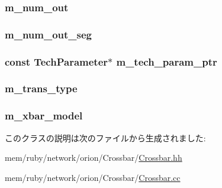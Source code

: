 \label{classCrossbar_a208d6aff22a25e908b139b8d84950212}
\hypertarget{classCrossbar_ae171d0f87af81b1ea185cf41b5877bdc}{
\subsubsection[{m\_\-num\_\-out}]{ {\bf m\_\-num\_\-out}}}
\label{classCrossbar_ae171d0f87af81b1ea185cf41b5877bdc}
\hypertarget{classCrossbar_ad3f4c106c1f38c6c0fa1030e00e2b925}{
\subsubsection[{m\_\-num\_\-out\_\-seg}]{ {\bf m\_\-num\_\-out\_\-seg}}}
\label{classCrossbar_ad3f4c106c1f38c6c0fa1030e00e2b925}
\hypertarget{classCrossbar_a11d1644aa2bfe0e16783dface6fadf13}{
\subsubsection[{m\_\-tech\_\-param\_\-ptr}]{\setlength{\rightskip}{0pt plus 5cm}const {\bf TechParameter}$\ast$ {\bf m\_\-tech\_\-param\_\-ptr}}}
\label{classCrossbar_a11d1644aa2bfe0e16783dface6fadf13}
\hypertarget{classCrossbar_ac53175ac9654b65ce59b57695eaa749c}{
\subsubsection[{m\_\-trans\_\-type}]{ {\bf m\_\-trans\_\-type}}}
\label{classCrossbar_ac53175ac9654b65ce59b57695eaa749c}
\hypertarget{classCrossbar_ae408c5e80d21ee95cc1ea98cdf4491bf}{
\subsubsection[{m\_\-xbar\_\-model}]{ {\bf m\_\-xbar\_\-model}}}
\label{classCrossbar_ae408c5e80d21ee95cc1ea98cdf4491bf}


このクラスの説明は次のファイルから生成されました:\begin{DoxyCompactItemize}
\item 
mem/ruby/network/orion/Crossbar/\hyperlink{Crossbar_8hh}{Crossbar.hh}\item 
mem/ruby/network/orion/Crossbar/\hyperlink{Crossbar_8cc}{Crossbar.cc}\end{DoxyCompactItemize}
